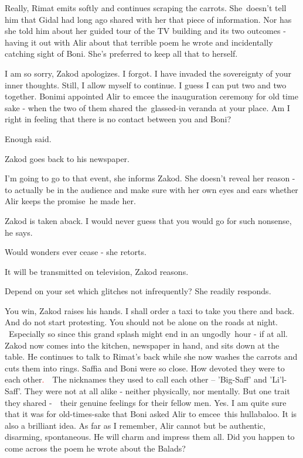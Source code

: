 \documentclass[letterpaper]{article}
\begin{document}
{\textquotedbl}Really,{\textquotedbl} Rimat emits softly and continues scraping the carrots. She~doesn't tell him that
Gidal had long ago shared with her that piece of information. Nor has she told him about her guided tour of the TV
building and its two outcomes - having it out with Alir about that terrible poem he wrote and incidentally catching
sight of Boni. She{}'s preferred to keep all that to herself. ~

{\textquotedbl}I am so sorry,{\textquotedbl} Zakod apologizes. {\textquotedbl}I forgot. I have invaded the sovereignty
of your inner thoughts. Still, I allow myself to continue. I guess I can put two and two together. Bonimi appointed
Alir to emcee the inauguration ceremony for old time sake - when the two of them shared the\ glassed-in veranda at your
place. Am I right in feeling that there is no contact between you and Boni?{\textquotedbl}

{\textquotedbl}Enough said.{\textquotedbl} 

Zakod goes back to his newspaper. 

{\textquotedbl}I'm going to go to that event,{\textquotedbl} she informs Zakod. She doesn't reveal her reason - to
actually be in the audience and make sure with her own eyes and ears whether Alir keeps  the promise\ he made 
her.\textcolor[rgb]{0.0,0.6901961,0.9411765}{\ }

Zakod is taken aback. {\textquotedbl}I would never guess that you would go for such nonsense,{\textquotedbl} he says.

{\textquotedbl}Would wonders ever cease -{\textquotedbl} she retorts.

{\textquotedbl}It will be transmitted on television,{\textquotedbl} Zakod reasons.

{\textquotedbl}Depend on your set which glitches not infrequently?{\textquotedbl} She readily responds.\ 

{\textquotedbl}You win,{\textquotedbl} Zakod raises his hands. {\textquotedbl}I shall order a taxi to take you there and
back. And do not start protesting. You should not be alone on the roads at night. ~Especially so since this grand
splash might end in an ungodly\ hour - if at all.{\textquotedbl}~ Zakod now comes into the kitchen, newspaper in hand,
and sits down at the table. He continues to talk to Rimat's back while she now washes the carrots and cuts them into
rings. {\textquotedbl}Saffia and Boni were so close.  How devoted they were to each other\textcolor{red}{.}\ \ The
nicknames they used to call each other -- 'Big-Saff' and 'Li'l-Saff'. They were not at all alike - neither physically,
nor mentally. But one trait they shared -~\textcolor[rgb]{0.0,0.6901961,0.9411765}{\ }their genuine feelings for their
fellow men. Yes. I am quite sure that it was for old-times-sake that Boni asked Alir to emcee~this hullabaloo. It is
also a brilliant idea. As far as I remember, Alir cannot but be authentic, disarming, spontaneous. He will charm and
impress them all. Did you happen to come across the poem he wrote about the Balads?{\textquotedbl}
\end{document}
